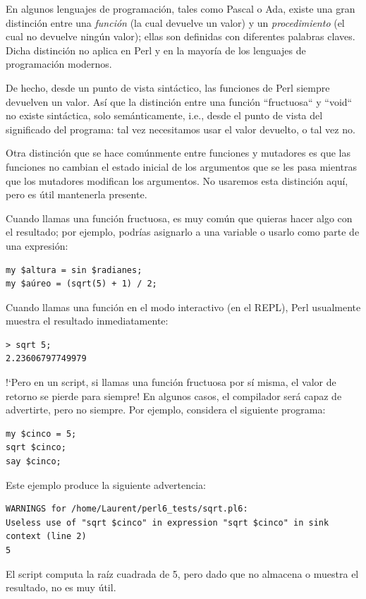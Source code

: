 En algunos lenguajes de programación, tales como Pascal o Ada,
existe una gran distinción entre una \emph{función} (la cual
devuelve un valor) y un \emph{procedimiento} (el cual no devuelve
ningún valor); ellas son definidas con diferentes palabras claves.
Dicha distinción no aplica en Perl y en la mayoría de los 
lenguajes de programación modernos.

De hecho, desde un punto de vista sintáctico, las funciones de Perl
siempre devuelven un valor. Así que la distinción entre una función
``fructuosa`` y ``void`` no existe sintáctica, solo semánticamente, i.e.,
desde el punto de vista del significado del programa: tal vez necesitamos
usar el valor devuelto, o tal vez no.

Otra distinción que se hace comúnmente entre funciones y mutadores es
que las funciones no cambian el estado inicial de los argumentos 
que se les pasa mientras que los mutadores modifican los argumentos. 
No usaremos esta distinción aquí, pero es útil mantenerla presente.

Cuando llamas una función fructuosa, es muy común que quieras
hacer algo con el resultado; por ejemplo, podrías asignarlo a una
variable o usarlo como parte de una expresión:
 
\begin{lstlisting}
my $altura = sin $radianes;
my $aúreo = (sqrt(5) + 1) / 2;
\end{lstlisting}
%
Cuando llamas una función en el modo interactivo (en
el REPL), Perl usualmente muestra el resultado inmediatamente:

\begin{lstlisting}
> sqrt 5;
2.23606797749979
\end{lstlisting}
%
!`Pero en un script, si llamas una función fructuosa por sí misma,
el valor de retorno se pierde para siempre! En algunos casos, el 
compilador será capaz de advertirte, pero no siempre. Por ejemplo,
considera el siguiente programa:

\begin{lstlisting}
my $cinco = 5;
sqrt $cinco;
say $cinco;
\end{lstlisting}

Este ejemplo produce la siguiente advertencia:

\begin{lstlisting}
WARNINGS for /home/Laurent/perl6_tests/sqrt.pl6:
Useless use of "sqrt $cinco" in expression "sqrt $cinco" in sink context (line 2)
5
\end{lstlisting}
%
El script computa la raíz cuadrada de 5, pero 
dado que no almacena o muestra el resultado, no es muy útil.

